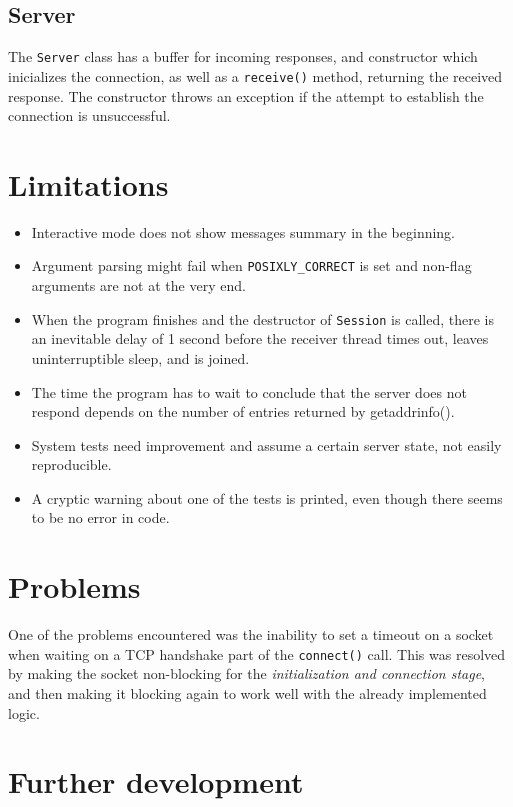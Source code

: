 \documentclass[a4]{report}
\begin{document}
\subsection{Server}

The \texttt{Server} class has a buffer for incoming responses, and constructor which inicializes the connection, as well as a \texttt{receive()} method, returning the received response. The constructor throws an exception if the attempt to establish the connection is unsuccessful.

\section{Limitations}

\begin{itemize}
  \item Interactive mode does not show messages summary in the beginning.
  \item Argument parsing might fail when \texttt{POSIXLY\_CORRECT} is set and non-flag arguments are not at the very end.
  \item When the program finishes and the destructor of \texttt{Session} is called, there is an inevitable delay of 1 second before the receiver thread times out, leaves uninterruptible sleep, and is joined.
  \item The time the program has to wait to conclude that the server does not respond depends on the number of entries returned by getaddrinfo().
  \item System tests need improvement and assume a certain server state, not easily reproducible.
  \item A cryptic warning about one of the tests is printed, even though there seems to be no error in code.
\end{itemize}

\section{Problems}

One of the problems encountered was the inability to set a timeout on a socket when waiting on a TCP handshake part of the \texttt{connect()} call. This was resolved by making the socket non-blocking for the \textit{initialization and connection stage}, and then making it blocking again to work well with the already implemented logic.\cite{timeout-sof}

\section{Further development}
\end{document}
